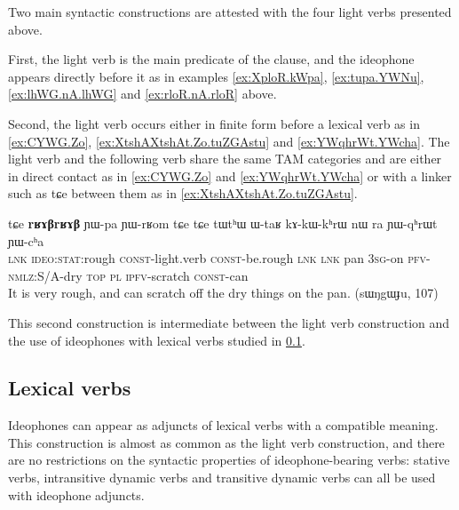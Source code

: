 \documentclass[oldfontcommands,oneside,a4paper,11pt]{article}
\newcommand{\ipa}[1]{{\phon \mbox{#1}}} %
\begin{document}
Two main syntactic constructions are attested with the four light verbs presented above.

First, the light verb is the main predicate of the clause, and the ideophone appears directly before it as in examples \ref{ex:XploR.kWpa}, \ref{ex:tupa.YWNu}, \ref{ex:lhWG.nA.lhWG} and \ref{ex:rloR.nA.rloR} above. 


Second, the light verb occurs either in finite   form before a lexical verb as in \ref{ex:CYWG.Zo}, \ref{ex:XtshAXtshAt.Zo.tuZGAstu}  and \ref{ex:YWqhrWt.YWcha}. The light verb and the following verb share the same TAM categories and are either in direct contact as in \ref{ex:CYWG.Zo} and \ref{ex:YWqhrWt.YWcha} or with a linker such as \ipa{tɕe} between them as in \ref{ex:XtshAXtshAt.Zo.tuZGAstu}.

\begin{exe}
\ex \label{ex:YWqhrWt.YWcha}
\gll
\ipa{tɕe} 	\ipa{\textbf{rʁɤβrʁɤβ}} 	\ipa{ɲɯ-pa} 	\ipa{ɲɯ-rʁom} 	\ipa{tɕe} 	\ipa{tɕe} 	\ipa{tɯtʰɯ} 	\ipa{ɯ-taʁ} 	\ipa{kɤ-kɯ-kʰrɯ} 	\ipa{nɯ} \ipa{ra} 	\ipa{ɲɯ-qʰrɯt} 	\ipa{ɲɯ-cʰa}       \\   
\textsc{lnk} \textsc{ideo:stat}:rough \textsc{const}-light.verb \textsc{const}-be.rough \textsc{lnk}  \textsc{lnk} pan \textsc{3sg}-on \textsc{pfv-nmlz}:S/A-dry \textsc{top} \textsc{pl} \textsc{ipfv}-scratch \textsc{const}-can \\        
\glt  It is very rough, and can scratch off the dry things on the pan. (sɯŋgɯɟu, 107) 
\end{exe}
This second construction is intermediate between the light verb construction  and the use of ideophones with lexical verbs studied in \ref{sec:ideophone.plus.lexical.verb}.




\subsection{Lexical verbs} \label{sec:ideophone.plus.lexical.verb}
Ideophones can appear as adjuncts of   lexical verbs with a compatible meaning. This construction is almost as common as the light verb construction, and there are no restrictions on the syntactic properties of ideophone-bearing verbs: stative verbs, intransitive dynamic verbs and transitive dynamic verbs can all be used with ideophone adjuncts.
\end{document}
